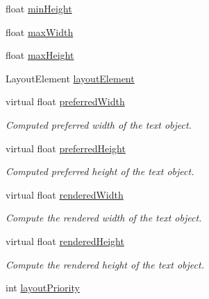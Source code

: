 \begin{DoxyCompactItemize}
\item 
float \mbox{\hyperlink{class_t_m_pro_1_1_t_m_p___text_aed588d5fd7ec93257c0be7894601d1df}{min\+Height}}
\item 
float \mbox{\hyperlink{class_t_m_pro_1_1_t_m_p___text_aa6e088b3f1a54ed007c98797dbb64b90}{max\+Width}}
\item 
float \mbox{\hyperlink{class_t_m_pro_1_1_t_m_p___text_ab14de74ba7d6eb4609f428cc78f4a3fa}{max\+Height}}
\item 
Layout\+Element \mbox{\hyperlink{class_t_m_pro_1_1_t_m_p___text_a61b28f09fc8b65fa0dd44be148751f6e}{layout\+Element}}
\item 
virtual float \mbox{\hyperlink{class_t_m_pro_1_1_t_m_p___text_a34ccac47d5d15bd04241a85773d6dc11}{preferred\+Width}}
\begin{DoxyCompactList}\small\item\em Computed preferred width of the text object. \end{DoxyCompactList}\item 
virtual float \mbox{\hyperlink{class_t_m_pro_1_1_t_m_p___text_a612f2886a41239955c33fe784b5f3437}{preferred\+Height}}
\begin{DoxyCompactList}\small\item\em Computed preferred height of the text object. \end{DoxyCompactList}\item 
virtual float \mbox{\hyperlink{class_t_m_pro_1_1_t_m_p___text_a101c97facd69481e2a0aed24b310b9c4}{rendered\+Width}}
\begin{DoxyCompactList}\small\item\em Compute the rendered width of the text object. \end{DoxyCompactList}\item 
virtual float \mbox{\hyperlink{class_t_m_pro_1_1_t_m_p___text_a6471229b4d6df638b673ce4bd00a62ce}{rendered\+Height}}
\begin{DoxyCompactList}\small\item\em Compute the rendered height of the text object. \end{DoxyCompactList}\item 
int \mbox{\hyperlink{class_t_m_pro_1_1_t_m_p___text_a5d348749c0944d708b27bbf46581f460}{layout\+Priority}}
\end{DoxyCompactItemize}


